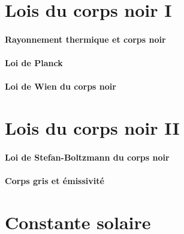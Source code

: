 \documentclass[a4paper,DIV16,10pt]{scrartcl}
\begin{document}
\begin{detail} 
\newpage
\section{Lois du corps noir I}
	\paragraph{Rayonnement thermique et corps noir}
		
		

	\paragraph{Loi de Planck}
		

	\paragraph{Loi de Wien du corps noir}
		

%

\newpage
\section{Lois du corps noir II}
	\paragraph{Loi de Stefan-Boltzmann du corps noir}
		
	\paragraph{Corps gris et émissivité}
		
\end{detail}


\newpage
\section{Constante solaire}


\end{document}
